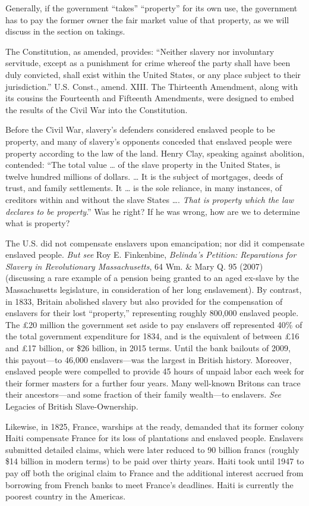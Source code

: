 Generally, if the government ``takes'' ``property'' for its own use, the
government has to pay the former owner the fair market value of that property,
as we will discuss in the section on takings.

The Constitution, as amended, provides: ``Neither slavery nor involuntary
servitude, except as a punishment for crime whereof the party shall have been
duly convicted, shall exist within the United States, or any place subject to
their jurisdiction.'' U.S. Const., amend. XIII. The Thirteenth Amendment, along
with its cousins the Fourteenth and Fifteenth Amendments, were designed to
embed the results of the Civil War into the Constitution.  

Before the Civil War, slavery's defenders considered enslaved people to be
property, and many of slavery's opponents conceded that enslaved people were
property according to the law of the land.  Henry Clay, speaking against
abolition, contended: ``The total value {\dots} of the slave property in the
United States, is twelve hundred millions of dollars. {\dots}  It is the
subject of mortgages, deeds of trust, and family settlements. It {\dots} is the
sole reliance, in many instances, of creditors within and without the slave
States {\dots}. \textit{That is property which the law declares to be
property}.''  Was he right?  If he was wrong, how are we to determine what is
property?

The U.S. did not compensate enslavers upon emancipation; nor did it compensate
enslaved people.  \textit{But see }Roy E. Finkenbine, \textit{Belinda's
Petition: Reparations for Slavery in Revolutionary Massachusetts}, 64 Wm. \&
Mary Q. 95 (2007) (discussing a rare example of a pension being granted to an
aged ex-slave by the Massachusetts legislature, in consideration of her long
enslavement).  By contrast, in 1833, Britain abolished slavery but also
provided for the compensation of enslavers for their lost ``property,''
representing roughly 800,000 enslaved people.  The {\pounds}20 million the
government set aside to pay enslavers off represented 40\% of the total
government expenditure for 1834, and is the equivalent of between {\pounds}16
and {\pounds}17 billion, or \$26 billion, in 2015 terms.  Until the bank
bailouts of 2009, this payout---to 46,000 enslavers---was the largest in
British history.  Moreover, enslaved people were compelled to provide 45 hours
of unpaid labor each week for their former masters for a further four years. 
Many well-known Britons can trace their ancestors---and some fraction of their
family wealth---to enslavers.  \textit{See}
{Legacies of British Slave-Ownership}.

Likewise, in 1825, France, warships at the ready, demanded that its former
colony Haiti compensate France for its loss of plantations and enslaved people.
 Enslavers submitted detailed claims, which were later reduced to 90 billion
francs (roughly \$14 billion in modern terms) to be paid over thirty years. 
Haiti took until 1947 to pay off both the original claim to France and the
additional interest accrued from borrowing from French banks to meet France's
deadlines.  Haiti is currently the poorest country in the Americas.  

